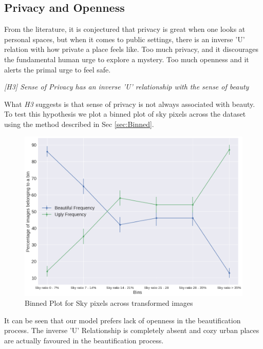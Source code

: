 \subsection{Privacy and  Openness }
From the literature, it is conjectured that privacy is great when one
looks at personal spaces, but when it comes to public settings, there is an inverse 'U' relation with how private a place feels like. 
Too much privacy, and it discourages the fundamental human urge to explore a mystery. Too much openness and it alerts the primal urge to feel safe. 
\par
\textit{[H3] Sense of Privacy has an inverse 'U' relationship with the sense of beauty }
\par
What \textit{H3} suggests is that sense of privacy is not always associated with beauty. 
To test this hypothesis we plot a binned plot of sky pixels across the dataset using the method described in Sec \ref{sec:Binned}. 

\begin{figure}[h]
	\centering
	\includegraphics[width=\columnwidth]{Plot/BinnedPlot.png}
	\caption{Binned Plot for Sky pixels across transformed images}
	\label{fig:greenBinned}
\end{figure}

It can be seen that our model prefers lack of openness in the beautification process. The inverse 'U' Relationship is completely absent and cozy urban places are actually favoured in the beautification process. 


